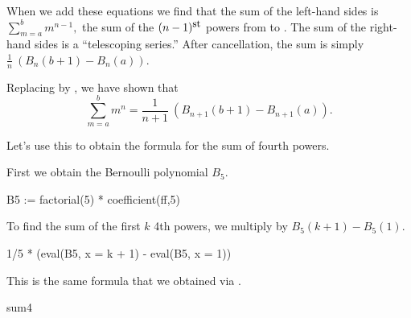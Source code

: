 {{{{{{{{{{{{{{{{When we add these equations we find that
the sum of the left-hand sides is
$\sum_{m=a}^{b} m^{n-1},$%
the sum of the
$(n-1)^{\hbox{\small\rm st}}$
powers from  to .
The sum of the right-hand sides is a ``telescoping series.''
After cancellation, the sum is simply
$\frac{1}{n}\:(B_n(b + 1) - B_n(a))$.

Replacing  by , we have shown that
\begin{displaymath}
\sum_{m = a}^{b} m^n = \frac{1}{\displaystyle n + 1} \:
(B_{n+1}(b + 1) - B_{n+1}(a)).
\end{displaymath}

Let's use this to obtain the formula for the sum of fourth powers.
\begin{xtc}
\begin{xtccomment}
First we obtain the Bernoulli polynomial $B_5$.
\end{xtccomment}
\begin{spadsrc}
B5 := factorial(5) * coefficient(ff,5) 
\end{spadsrc}
\begin{TeXOutput}
\begin{fricasmath}{10}
%
\end{fricasmath}
\end{TeXOutput}
\end{xtc}
%
\begin{xtc}
\begin{xtccomment}
To find the sum of the first $k$ 4th powers,
we multiply  by
$B_5(k+1) - B_5(1)$.
\end{xtccomment}
\begin{spadsrc}
1/5 * (eval(B5, x = k + 1) - eval(B5, x = 1)) 
\end{spadsrc}
\begin{TeXOutput}
\begin{fricasmath}{11}
%
\end{fricasmath}
\end{TeXOutput}
\end{xtc}
%
\begin{xtc}
\begin{xtccomment}
This is the same formula that we obtained via .
\end{xtccomment}
\begin{spadsrc}
sum4 
\end{spadsrc}
\begin{TeXOutput}
\begin{fricasmath}{12}
%
\end{fricasmath}
\end{TeXOutput}
\end{xtc}

}}}}}}}}}}}}}}}}
